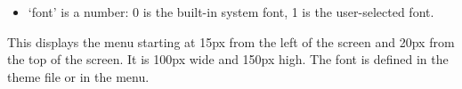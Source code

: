   \begin{itemize}
    \item `font' is a number: 0 is the built-in system font, 1 is the
    user-selected font.
  \end{itemize}

\begin{example}
\end{example}
This displays the menu starting at 15px from the left of the screen and 20px
from the top of the screen.  It is 100px wide and 150px high. The font is
defined in the theme  file or in the  menu.

